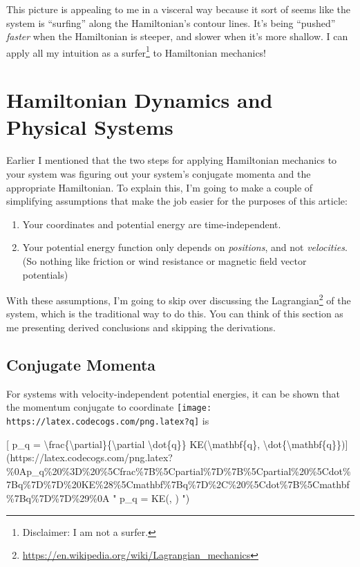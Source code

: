 \documentclass[]{article}
\renewcommand{\href}[2]{#2\footnote{\url{#1}}}
\begin{document}
This picture is appealing to me in a visceral way because it sort of seems like
the system is ``surfing'' along the Hamiltonian's contour lines. It's being
``pushed'' \emph{faster} when the Hamiltonian is steeper, and slower when it's
more shallow. I can apply all my intuition as a surfer\footnote{Disclaimer: I am
  not a surfer.} to Hamiltonian mechanics!

\hypertarget{hamiltonian-dynamics-and-physical-systems}{%
\section{Hamiltonian Dynamics and Physical
Systems}\label{hamiltonian-dynamics-and-physical-systems}}

Earlier I mentioned that the two steps for applying Hamiltonian mechanics to
your system was figuring out your system's conjugate momenta and the appropriate
Hamiltonian. To explain this, I'm going to make a couple of simplifying
assumptions that make the job easier for the purposes of this article:

\begin{enumerate}
\def\labelenumi{\arabic{enumi}.}
\tightlist
\item
  Your coordinates and potential energy are time-independent.
\item
  Your potential energy function only depends on \emph{positions}, and not
  \emph{velocities}. (So nothing like friction or wind resistance or magnetic
  field vector potentials)
\end{enumerate}

With these assumptions, I'm going to skip over discussing the
\href{https://en.wikipedia.org/wiki/Lagrangian_mechanics}{Lagrangian} of the
system, which is the traditional way to do this. You can think of this section
as me presenting derived conclusions and skipping the derivations.

\hypertarget{conjugate-momenta}{%
\subsection{Conjugate Momenta}\label{conjugate-momenta}}

For systems with velocity-independent potential energies, it can be shown that
the momentum conjugate to coordinate
\texttt{[image: https://latex.codecogs.com/png.latex?q]} is

{[} p\_q =
\textbackslash{}frac\{\textbackslash{}partial\}\{\textbackslash{}partial
\textbackslash{}dot\{q\}\} KE(\textbackslash{}mathbf\{q\},
\textbackslash{}dot\{\textbackslash{}mathbf\{q\}\}){]}(https://latex.codecogs.com/png.latex?\%0Ap\_q\%20\%3D\%20\%5Cfrac\%7B\%5Cpartial\%7D\%7B\%5Cpartial\%20\%5Cdot\%7Bq\%7D\%7D\%20KE\%28\%5Cmathbf\%7Bq\%7D\%2C\%20\%5Cdot\%7B\%5Cmathbf\%7Bq\%7D\%7D\%29\%0A
" p\_q =  KE(, ) ")
\end{document}
